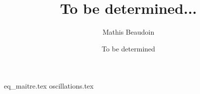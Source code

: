 \documentclass{article}
\title{\textbf{To be determined...}}
\author{Mathis Beaudoin}
\date{To be determined}
\numberwithin{equation}{section}
\begin{document}

\maketitle
\clearpage

\tableofcontents
\clearpage


\newpage
{}
\setcounter{page}{1}

{eq_maitre.tex}
{oscillations.tex}

\newpage
 
 
\end{document}
